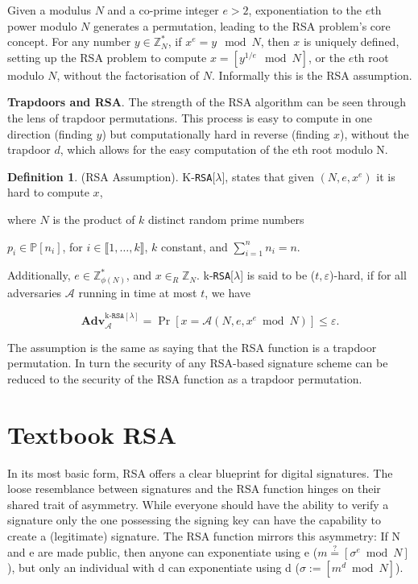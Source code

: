 \documentclass[]{final_report}
\theoremstyle{definition}
\newtheorem{definition}{Definition}[chapter]
\begin{document}
Given a modulus \(N\) and a co-prime integer \(e > 2\), exponentiation to the \(e\)th power modulo \(N\) generates a permutation, leading to the RSA problem's core concept. For any number \(y \in \mathbb{Z}^*_{N}\), if \(x^e = y \mod N\), then \(x\) is uniquely defined, setting up the RSA problem to compute \(x = [y^{1/e} \mod N]\), or the \(e\)th root modulo \(N\), without the factorisation of \(N\). Informally this is the RSA assumption.

\textbf{Trapdoors and RSA}. The strength of the RSA algorithm can be seen through the lens of trapdoor permutations. This process is easy to compute in one direction (finding \(y\)) but computationally hard in reverse (finding \(x\)), without the trapdoor \(d\), which allows for the easy computation of the eth root modulo N.

\begin{definition}
\label{def:RSA-ASS}
(RSA Assumption). K-\texttt{RSA}[$\lambda$], states that given $(N, e, x^e)$ it is hard to compute $x$, 

where $N$ is the product of $k$ distinct random prime numbers 

$p_i \in \mathbb{P}[n_i]$, for $i \in \llbracket1, \ldots, k \rrbracket$, $k$ constant, and $\displaystyle\sum_{i=1}^{n} n_i = n$. 

Additionally, $e \in \mathbb{Z}_{\phi(N)}^{*}$, and $x \in_R \mathbb{Z}_N$. k-\texttt{RSA}[$\lambda$] is said to be ($t, \varepsilon$)-hard, if for all adversaries $ \mathcal{A}$ running in time at most $t$, we have

\[ \textbf{Adv}_ \mathcal{A}^{\text{k-}\texttt{RSA}[\lambda]} = \Pr [x =  \mathcal{A}(N, e, x^e \bmod N) ] \leq \varepsilon. \]
\end{definition}

The assumption is the same as saying that the RSA function is a trapdoor permutation. In turn the security of any RSA-based signature scheme can be reduced to the security of the RSA function as a trapdoor permutation.


\section{Textbook RSA}
In its most basic form, RSA offers a clear blueprint for digital signatures. The loose resemblance between signatures and the RSA function hinges on their shared trait of asymmetry. While everyone should have the ability to verify a signature only the one possessing the signing key can have the capability to create a (legitimate) signature. The RSA function mirrors this asymmetry: If N and e are made public, then anyone can exponentiate using e ($m \stackrel{?}{=} [\sigma^e \bmod N]$), but only an individual with d can exponentiate using d ($\sigma := [m^d \bmod N]$). 
\end{document}
